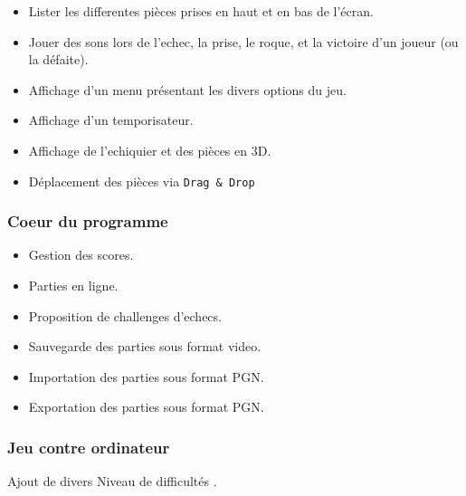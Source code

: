 \documentclass{article}
\begin{document}
\begin{itemize}

\item Lister les differentes pièces prises en haut et en bas de l'écran.
\item Jouer des sons lors de l'echec, la prise, le roque, et la victoire d'un joueur (ou la défaite).
\item Affichage d'un menu présentant les divers options du jeu.
\item Affichage d'un temporisateur.
\item Affichage de l'echiquier et des pièces en 3D.
\item Déplacement des pièces via \texttt{Drag \& Drop}

\end{itemize}

\subsubsection{Coeur du programme}

\begin{itemize}

\item Gestion des scores.
\item Parties en ligne.
\item Proposition de challenges d'echecs.
\item Sauvegarde des parties sous format video.
\item Importation des parties sous format PGN.
\item Exportation des parties sous format PGN.

\end{itemize}

\subsubsection{Jeu contre ordinateur}

Ajout de divers Niveau de difficultés .
\end{document}
